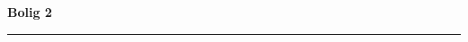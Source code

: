 \documentclass[11pt,a4paper]{article}
\begin{document}
{\bfseries\color{black}\large Bolig 2}

\vspace{8pt}
\noindent\textcolor{black}{\rule{\textwidth}{0.8pt}}

\vspace{10pt}
\end{document}
